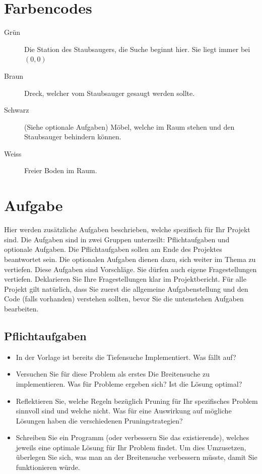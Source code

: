 \documentclass[a4paper,11pt,german,notitlepage]{report}
\begin{document}
\section*{Farbencodes}
\begin{description}
    \item[Grün] Die Station des Staubsaugers, die Suche beginnt hier. Sie liegt immer bei $(0,0)$
    \item[Braun] Dreck, welcher vom Staubsauger gesaugt werden sollte.
    \item[Schwarz] (Siehe optionale Aufgaben) Möbel, welche im Raum stehen und den Staubsauger behindern können.
    \item[Weiss] Freier Boden im Raum.
\end{description}


\section*{Aufgabe}
Hier werden zusätzliche Aufgaben beschrieben, welche spezifisch für Ihr Projekt sind.
Die Aufgaben sind in zwei Gruppen unterzeilt: Pflichtaufgaben und optionale Aufgaben.
Die Pflichtaufgaben sollen am Ende des Projektes beantwortet sein.
Die optionalen Aufgaben dienen dazu, sich weiter im Thema zu vertiefen.
Diese Aufgaben sind Vorschläge. Sie dürfen auch eigene Fragestellungen vertiefen.
Deklarieren Sie Ihre Fragestellungen klar im Projektbericht.
Für alle Projekt gilt natürlich, dass Sie zuerst die allgemeine Aufgabenstellung und den Code (falls vorhanden) verstehen sollten, bevor Sie die untenstehen Aufgaben bearbeiten.
\subsection*{Pflichtaufgaben}
\begin{itemize}
    \item In der Vorlage ist bereits die Tiefensuche Implementiert. Was fällt auf?
    \item Versuchen Sie für diese Problem als erstes Die Breitensuche zu implementieren. Was für Probleme ergeben sich? Ist die Lösung optimal?
    \item Reflektieren Sie, welche Regeln bezüglich Pruning für Ihr spezifisches Problem sinnvoll sind und welche nicht. Was für eine Auswirkung auf mögliche Lösungen haben die verschiedenen Pruningstrategien?
    \item Schreiben Sie ein Programm (oder verbessern Sie das existierende), welches jeweils eine optimale Lösung für Ihr Problem findet. Um dies Umzusetzen, überlegen Sie sich, was man an der Breitensuche verbessern müsste, damit Sie funktionieren würde.
\end{itemize}
\end{document}
